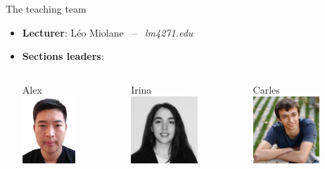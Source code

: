 \documentclass{beamer}
\begin{document}
\begin{frame}[t]{The teaching team}

	\begin{itemize}
		\item \textbf{Lecturer}: \quad Léo Miolane \  -- \ \emph{lm4271\@nyu.edu}
\vspace{0.3cm}
			\vspace{0.3cm}
			\pause
		\item \textbf{Sections leaders}:
			\vspace{0.2cm}
			\begin{columns}
				\begin{column}{0.3\textwidth}
					\begin{center}
						Alex
						\\
						\vspace*{0.2cm}
						\includegraphics[height=2.5cm]{./alex.jpeg}
					\end{center}
				\end{column}
				\begin{column}{0.3\textwidth}
					\begin{center}
						Irina
						\\
						\vspace*{0.2cm}
						\includegraphics[height=2.5cm]{./irina.jpeg}
					\end{center}
				\end{column}
				\begin{column}{0.3\textwidth}
					\begin{center}
						Carles
						\\
						\vspace*{0.2cm}
						\includegraphics[height=2.5cm]{./carles.jpeg}
					\end{center}
				\end{column}
			\end{columns}
	\end{itemize}

\end{frame}
\end{document}
